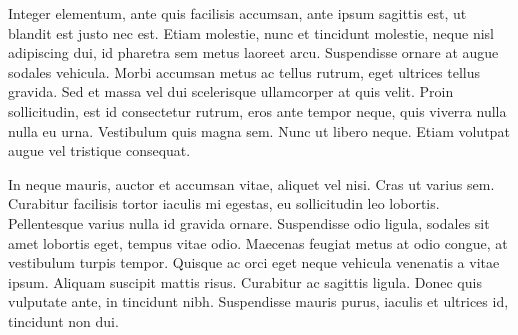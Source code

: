 Integer elementum, ante quis facilisis accumsan, ante ipsum sagittis est, ut blandit est justo nec est. Etiam molestie, nunc et tincidunt molestie, neque nisl adipiscing dui, id pharetra sem metus laoreet arcu. Suspendisse ornare at augue sodales vehicula. Morbi accumsan metus ac tellus rutrum, eget ultrices tellus gravida. Sed et massa vel dui scelerisque ullamcorper at quis velit. Proin sollicitudin, est id consectetur rutrum, eros ante tempor neque, quis viverra nulla nulla eu urna. Vestibulum quis magna sem. Nunc ut libero neque. Etiam volutpat augue vel tristique consequat.

In neque mauris, auctor et accumsan vitae, aliquet vel nisi. Cras ut varius sem. Curabitur facilisis tortor iaculis mi egestas, eu sollicitudin leo lobortis. Pellentesque varius nulla id gravida ornare. Suspendisse odio ligula, sodales sit amet lobortis eget, tempus vitae odio. Maecenas feugiat metus at odio congue, at vestibulum turpis tempor. Quisque ac orci eget neque vehicula venenatis a vitae ipsum. Aliquam suscipit mattis risus. Curabitur ac sagittis ligula. Donec quis vulputate ante, in tincidunt nibh. Suspendisse mauris purus, iaculis et ultrices id, tincidunt non dui.
